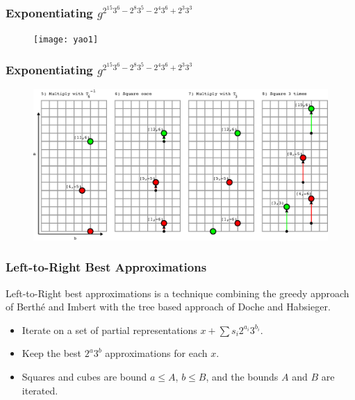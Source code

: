 \documentclass{beamer}
\begin{document}
\begin{frame}
\frametitle{Exponentiating $g^{2^{15} 3^6 -2^8 3^5 -2^4 3^6 +2^3 3^3}$}
\begin{figure}
\texttt{[image: yao1]}
\end{figure}
\end{frame}
\begin{frame}
\frametitle{Exponentiating $g^{2^{15} 3^6 -2^8 3^5 -2^4 3^6 +2^3 3^3}$}
\begin{figure}
\includegraphics[scale=0.70]{yao2}
\end{figure}
\end{frame}


\begin{frame}
\frametitle{Left-to-Right Best Approximations}
Left-to-Right best approximations is a technique combining the greedy approach of Berth{\'e} and Imbert with the tree based approach of Doche and Habsieger.
\begin{itemize}
\item<2-> Iterate on a set of partial representations $x + \sum s_i2^{a_i}3^{b_i}$.
\item<3-> Keep the best $2^a 3^b$ approximations for each $x$.
\item<4-> Squares and cubes are bound $a \le A$, $b \le B$, and the bounds $A$ and $B$ are iterated.
\end{itemize}
\end{frame}
\end{document}

